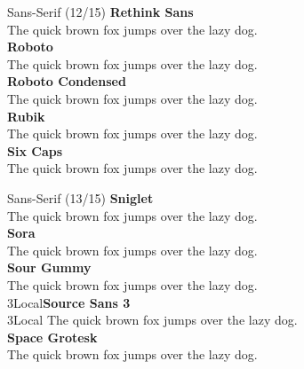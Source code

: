 \documentclass[10pt]{beamer}
\begin{document}
\begin{frame}{Sans-Serif (12/15)}
\vspace{-0.2cm}
  {\RethinkSansLocal\Large\bfseries Rethink Sans\\}
  {\RethinkSansLocal The quick brown fox jumps over the lazy dog.\\[0.3cm]}
  {\RobotoLocal\Large\bfseries Roboto\\}
  {\RobotoLocal The quick brown fox jumps over the lazy dog.\\[0.3cm]}
  {\RobotoCondensedLocal\Large\bfseries Roboto Condensed\\}
  {\RobotoCondensedLocal The quick brown fox jumps over the lazy dog.\\[0.3cm]}
  {\RubikLocal\Large\bfseries Rubik\\}
  {\RubikLocal The quick brown fox jumps over the lazy dog.\\[0.3cm]}
  {\SixCapsLocal\Large\bfseries Six Caps\\}
  {\SixCapsLocal The quick brown fox jumps over the lazy dog.\\[0.3cm]}
\end{frame}

\begin{frame}{Sans-Serif (13/15)}
\vspace{-0.2cm}
  {\SnigletLocal\Large\bfseries Sniglet\\}
  {\SnigletLocal The quick brown fox jumps over the lazy dog.\\[0.3cm]}
  {\SoraLocal\Large\bfseries Sora\\}
  {\SoraLocal The quick brown fox jumps over the lazy dog.\\[0.3cm]}
  {\SourGummyLocal\Large\bfseries Sour Gummy\\}
  {\SourGummyLocal The quick brown fox jumps over the lazy dog.\\[0.3cm]}
  {\SourceSans3Local\Large\bfseries Source Sans 3\\}
  {\SourceSans3Local The quick brown fox jumps over the lazy dog.\\[0.3cm]}
  {\SpaceGroteskLocal\Large\bfseries Space Grotesk\\}
  {\SpaceGroteskLocal The quick brown fox jumps over the lazy dog.\\[0.3cm]}
\end{frame}
\end{document}
